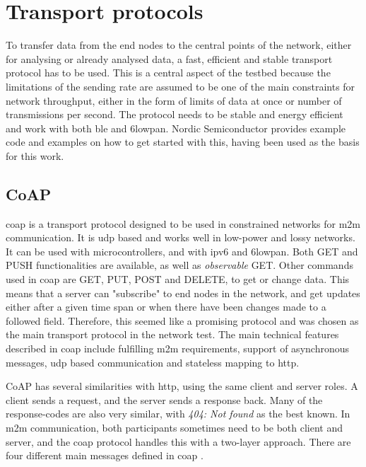 

\section{Transport protocols}

\noindent To transfer data from the end nodes to the central points of the network, either for analysing or already analysed data, a fast, efficient and stable transport protocol has to be used. This is a central aspect of the testbed because the limitations of the sending rate are assumed to be one of the main constraints for network throughput, either in the form of limits of data at once or number of transmissions per second. The protocol needs to be stable and energy efficient and work with both \gls{ble} and \gls{6lowpan}. Nordic Semiconductor provides example code and examples on how to get started with this, having been used as the basis for this work.

\subsection{CoAP}

 
\noindent \gls{coap} is a transport protocol designed to be used in constrained networks for \gls{m2m} communication. It is \gls{udp} based and works well in low-power and lossy networks. It can be used with \glspl{microcontroller}, and with \gls{ipv6} and \gls{6lowpan}. Both GET and PUSH functionalities are available, as well as \textit{observable} GET. Other commands used in \gls{coap} are GET, PUT, POST and DELETE, to get or change data. This means that a server can "subscribe" to end nodes in the network, and get updates either after a given time span or when there have been changes made to a followed field. Therefore, this seemed like a promising protocol and was chosen as the main transport protocol in the network test\cite{shelby2014constrained}. The main technical features described in \gls{coap} include fulfilling \gls{m2m} requirements, support of asynchronous messages, \gls{udp} based communication and stateless mapping to \gls{http}. 

\noindent CoAP has several similarities with \gls{http}, using the same client and server roles. A client sends a request, and the server sends a response back. Many of the response-codes are also very similar, with \textit{404: Not found} as the best known. In \gls{m2m} communication, both participants sometimes need to be both client and server, and the \gls {coap} protocol handles this with a two-layer approach. There are four different main messages defined in \gls{coap} \cite{shelby2014constrained}. 

